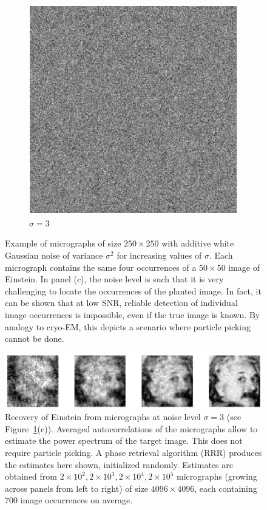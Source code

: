 \documentclass[12pt]{article}
\newcommand{\1}{\mathbf{1}}
\theoremstyle{plain}
\theoremstyle{definition}
\theoremstyle{remark}
\theoremstyle{plain}
\theoremstyle{remark}
\theoremstyle{plain}
\theoremstyle{plain}
\begin{document}
\begin{figure}[t]
\begin{subfigure}[h]{0.33\linewidth}
		\centering
		\includegraphics[width=.8\linewidth]{micrograph_Einstein_example_s3}
		\caption{$\sigma = 3$}
	\end{subfigure}
	\caption{\label{fig:micro_example} Example of micrographs of size $250\times 250$ with additive white Gaussian noise of variance $\sigma^2$ for increasing values of $\sigma$. Each micrograph contains the same four occurrences of a $50 \times 50$ image of Einstein. In panel (c), the noise level is such that it is very challenging to locate the occurrences of the planted image. In fact, it can be shown that at low SNR, reliable detection of individual image occurrences is impossible, even if the true image is known. By analogy to cryo-EM, this depicts a scenario where particle picking cannot be done.}
\end{figure}


\begin{figure}[t]
	\centering
	\includegraphics[width=1\linewidth]{Einstien_progress_examples}
	\caption{\label{fig:Einst_example} Recovery of Einstein from micrographs at noise level $\sigma = 3$ (see Figure~\ref{fig:micro_example}(c)). Averaged autocorrelations of the micrographs allow to estimate the power spectrum of the target image. This does not require particle picking. A phase retrieval algorithm (RRR) produces the estimates here shown, initialized randomly. Estimates are obtained from $2\times 10^2,2\times 10^3,2\times 10^4,2\times 10^5$ micrographs (growing across panels from left to right) of size $4096\times 4096$, each containing $700$ image occurrences on average.}	
\end{figure}
\end{document}
